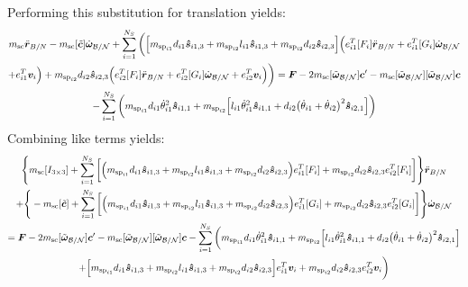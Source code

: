 \documentclass[paper]{aiaaNew}
\begin{document}
Performing this substitution for translation yields:
\begin{multline}
m_\text{sc} \ddot{\bm r}_{B/N} -m_\text{sc} [\tilde{\bm{c}}] \dot{\bm\omega}_{\cal B/N} +  \sum_{i=1}^{N_{S}}\bigg(\Big[m_{\text{sp}_{i1}}d_{i1} \bm{\hat{s}}_{i1,3} +m_{\text{sp}_{i2}}l_{i1} \bm{\hat{s}}_{i1,3}+m_{\text{sp}_{i2}} d_{i2}\bm{\hat{s}}_{i2,3}\Big]\Big(e_{i1}^T[F_i] \ddot{\bm r}_{B/N} + e_{i1}^T[G_i]\dot{\bm\omega}_{\cal B/N} \\
+ e_{i1}^T\bm v_i\Big) +m_{\text{sp}_{i2}} d_{i2} \bm{\hat{s}}_{i2,3}\Big(e_{i2}^T[F_i] \ddot{\bm r}_{B/N} + e_{i2}^T[G_i]\dot{\bm\omega}_{\cal B/N} + e_{i2}^T\bm v_i\Big)\bigg) 
= \bm F - 2m_\text{sc} [\tilde{\bm\omega}_{\cal B/N}] \bm c'- m_\text{sc} [\tilde{\bm\omega}_{\cal B/N}][\tilde{\bm\omega}_{\cal B/N}]\bm{c}\\
-\sum_{i=1}^{N_{S}}\bigg(m_{\text{sp}_{i1}}d_{i1} \dot{\theta}_{i1}^2 \bm{\hat{s}}_{i1,1} +m_{\text{sp}_{i2}}\Big[l_{i1} \dot{\theta}_{i1}^2 \bm{\hat{s}}_{i1,1} + d_{i2}\big(\dot{\theta}_{i1} + \dot{\theta}_{i2}\big)^2\bm{\hat{s}}_{i2,1}\Big]\bigg) 
\label{eq:Rbddot5}
\end{multline}
Combining like terms yields:
\begin{multline}
\Bigg \lbrace m_\text{sc} [I_{3\times 3}] +  \sum_{i=1}^{N_{S}}\bigg[\Big(m_{\text{sp}_{i1}}d_{i1} \bm{\hat{s}}_{i1,3} +m_{\text{sp}_{i2}}l_{i1} \bm{\hat{s}}_{i1,3}+m_{\text{sp}_{i2}} d_{i2}\bm{\hat{s}}_{i2,3}\Big)e_{i1}^T[F_i] +m_{\text{sp}_{i2}} d_{i2} \bm{\hat{s}}_{i2,3}e_{i2}^T[F_i] \bigg] \Bigg \rbrace \ddot{\bm r}_{B/N} \\
+\Bigg \lbrace-m_\text{sc} [\tilde{\bm{c}}] +  \sum_{i=1}^{N_{S}}\bigg[\Big(m_{\text{sp}_{i1}}d_{i1} \bm{\hat{s}}_{i1,3} +m_{\text{sp}_{i2}}l_{i1} \bm{\hat{s}}_{i1,3}+m_{\text{sp}_{i2}} d_{i2}\bm{\hat{s}}_{i2,3}\Big) e_{i1}^T[G_i] +m_{\text{sp}_{i2}} d_{i2} \bm{\hat{s}}_{i2,3} e_{i2}^T[G_i]\bigg] \Bigg \rbrace \dot{\bm\omega}_{\cal B/N} \\
= \bm F - 2m_\text{sc} [\tilde{\bm\omega}_{\cal B/N}] \bm c'- m_\text{sc} [\tilde{\bm\omega}_{\cal B/N}][\tilde{\bm\omega}_{\cal B/N}]\bm{c}
-\sum_{i=1}^{N_{S}}\bigg(m_{\text{sp}_{i1}}d_{i1} \dot{\theta}_{i1}^2 \bm{\hat{s}}_{i1,1} +m_{\text{sp}_{i2}}\Big[l_{i1} \dot{\theta}_{i1}^2 \bm{\hat{s}}_{i1,1} + d_{i2}\big(\dot{\theta}_{i1} + \dot{\theta}_{i2}\big)^2\bm{\hat{s}}_{i2,1}\Big]\\
 +\Big[m_{\text{sp}_{i1}}d_{i1} \bm{\hat{s}}_{i1,3} +m_{\text{sp}_{i2}}l_{i1} \bm{\hat{s}}_{i1,3}+m_{\text{sp}_{i2}} d_{i2}\bm{\hat{s}}_{i2,3}\Big]e_{i1}^T\bm v_i 
+m_{\text{sp}_{i2}} d_{i2} \bm{\hat{s}}_{i2,3}e_{i2}^T\bm v_i \bigg) 
\label{eq:Rbddot6}
\end{multline}
\end{document}
